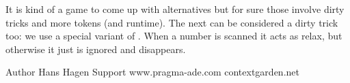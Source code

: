 \typebuffer[c] \getbuffer[c,b]

\fi

It is kind of a game to come up with alternatives but for sure those involve
dirty tricks and more tokens (and runtime). The next can be considered a dirty
trick too: we use a special variant of \type {\relax}. When a number is scanned
it acts as relax, but otherwise it just is ignored and disappears.

\ifdefined\norelax\else\let\norelax\relax\fi

\startbuffer[c]
\stopbuffer

\typebuffer[c] \getbuffer[c,b]

\stopsection

\startsubject[title=Colofon]

\starttabulate
\NC Author      \NC Hans Hagen         \NC \NR
\NC \CONTEXT    \NC \contextversion    \NC \NR
\NC \LUAMETATEX \NC \texengineversion  \NC \NR
\NC Support     \NC www.pragma-ade.com \NC \NR
\NC             \NC contextgarden.net  \NC \NR
\stoptabulate

\stopsubject

\popoverloadmode

\stopdocument




